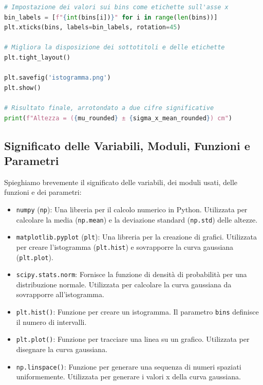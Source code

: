 \documentclass{article}
\begin{document}
\begin{lstlisting}[language=Python, caption={Script Python per calcolare e visualizzare le altezze}]
# Impostazione dei valori sui bins come etichette sull'asse x
bin_labels = [f"{int(bins[i])}" for i in range(len(bins))]
plt.xticks(bins, labels=bin_labels, rotation=45)

# Migliora la disposizione dei sottotitoli e delle etichette
plt.tight_layout()

plt.savefig('istogramma.png')
plt.show()

# Risultato finale, arrotondato a due cifre significative
print(f"Altezza = ({mu_rounded} ± {sigma_x_mean_rounded}) cm")
\end{lstlisting}

\subsection{Significato delle Variabili, Moduli, Funzioni e Parametri}
Spieghiamo brevemente il significato delle variabili, dei moduli usati, delle funzioni e dei parametri:

\begin{itemize}
    \item \texttt{numpy} (\texttt{np}): Una libreria per il calcolo numerico in Python. Utilizzata per calcolare la media (\texttt{np.mean}) e la deviazione standard (\texttt{np.std}) delle altezze.
    \item \texttt{matplotlib.pyplot} (\texttt{plt}): Una libreria per la creazione di grafici. Utilizzata per creare l'istogramma (\texttt{plt.hist}) e sovrapporre la curva gaussiana (\texttt{plt.plot}).
    \item \texttt{scipy.stats.norm}: Fornisce la funzione di densità di probabilità per una distribuzione normale. Utilizzata per calcolare la curva gaussiana da sovrapporre all'istogramma.
    \item \texttt{plt.hist()}: Funzione per creare un istogramma. Il parametro \texttt{bins} definisce il numero di intervalli.
    \item \texttt{plt.plot()}: Funzione per tracciare una linea su un grafico. Utilizzata per disegnare la curva gaussiana.
    \item \texttt{np.linspace()}: Funzione per generare una sequenza di numeri spaziati uniformemente. Utilizzata per generare i valori x della curva gaussiana.
\end{itemize}
\end{document}
